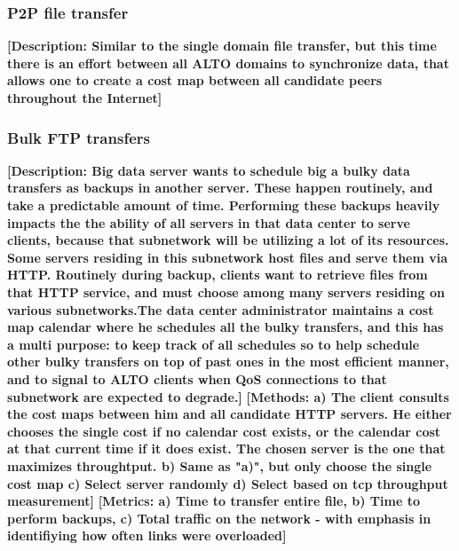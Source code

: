 \subsubsection{P2P file transfer}
\textbf{[Description: Similar to the single domain file transfer, but this time there is an effort between all ALTO domains to synchronize data, that allows one to create a cost map between all candidate peers throughout the Internet]}

\subsubsection{Bulk FTP transfers}
\textbf{[Description: Big data server wants to schedule big a bulky data transfers as backups in another server. These happen routinely, and take a predictable amount of time. Performing these backups heavily impacts the the ability of all servers in that data center to serve clients, because that subnetwork will be utilizing a lot of its resources. Some servers residing in this subnetwork host files and serve them via HTTP. Routinely during backup, clients want to retrieve files from that HTTP service, and must choose among many servers residing on various subnetworks.The data center administrator maintains a cost map calendar where he schedules all the bulky transfers, and this has a multi purpose: to keep track of all schedules so to help schedule other bulky transfers on top of past ones in the most efficient manner, and to signal to ALTO clients when QoS connections to that subnetwork are expected to degrade.]}
\textbf{[Methods: a) The client consults the cost maps between him and all candidate HTTP servers. He either chooses the single cost if no calendar cost exists, or the calendar cost at that current time if it does exist. The chosen server is the one that maximizes throughtput. b) Same as "a)", but only choose the single cost map c) Select server randomly d) Select based on tcp throughput measurement]}
\textbf{[Metrics: a) Time to transfer entire file, b) Time to perform backups, c) Total traffic on the network - with emphasis in identifiying how often links were overloaded]}


